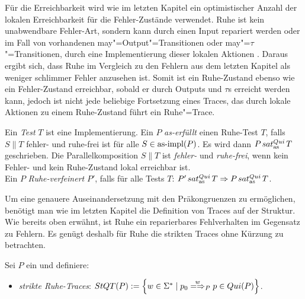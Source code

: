 Für die Erreichbarkeit wird wie im letzten Kapitel ein optimistischer Anzahl
der lokalen Erreichbarkeit für die Fehler-Zustände verwendet. Ruhe ist kein
unabwendbare \glqq Fehler-Art\grqq{}, sondern kann durch einen Input repariert
werden oder im Fall von vorhandenen may"=Output"=Transitionen oder
may"=$\tau$"=Transitionen, durch eine Implementierung dieser lokalen Aktionen .
Daraus ergibt sich, dass Ruhe im Vergleich zu den Fehlern aus dem letzten
Kapitel als weniger \glqq schlimmer Fehler\grqq{} anzusehen ist. Somit ist ein
Ruhe-Zustand ebenso wie ein Fehler-Zustand erreichbar, sobald er durch Outputs
und $\tau$s erreicht werden kann, jedoch ist nicht jede beliebige Fortsetzung
eines Traces, das durch lokale Aktionen zu einem Ruhe-Zustand führt ein
Ruhe"=Trace.

\begin{Def}
  \label{RuheTestDef}
  Ein \emph{Test} $T$ ist eine Implementierung. Ein \MEIO{} $P$
  \emph{as-erfüllt} einen Ruhe-Test $T$, falls $S\|T$ fehler- und ruhe-frei ist
  für alle $S\in \mathrm{as}\text{-}\mathrm{impl} (P)$. Es wird dann $P \hspace{0.05cm}sat_\mathrm{as}^{Qui}\hspace{0.05cm} T$ geschrieben. Die
  Parallelkomposition $S\|T$ ist \emph{fehler-} und \emph{ruhe-frei}, wenn kein
  Fehler- und kein Ruhe-Zustand lokal erreichbar ist.\\
  Ein \MEIO{} $P$ \emph{Ruhe-verfeinert} $P'$, falls für alle Tests $T$:
  $P'\hspace{0.05cm}sat_\mathrm{as}^{Qui}\hspace{0.05cm} T \Rightarrow P\hspace{0.05cm}sat_\mathrm{as}^{Qui}\hspace{0.05cm} T$.
\end{Def}

Um eine genauere Auseinandersetzung mit den Präkongruenzen zu ermöglichen,
benötigt man wie im letzten Kapitel die Definition von Traces auf der Struktur.
Wie bereits oben erwähnt, ist Ruhe ein reparierbares \glqq Fehlverhalten\grqq{}
im Gegensatz zu Fehlern. Es genügt deshalb für Ruhe die strikten Traces ohne
Kürzung zu betrachten.

\begin{Def}
  \label{RuheTraceDef}
  Sei $P$ ein \MEIO{} und definiere:
  \begin{itemize}
    \item \emph{strikte Ruhe-Traces}: $\StQT (P) := \left\{w\in\Sigma ^*\mid
      p_0 \weakmay[w]_P p\in Qui(P)\right\}$.
  \end{itemize}
\end{Def}

\vspace{0.2cm}

